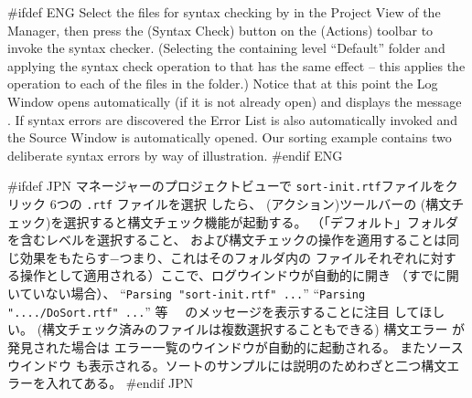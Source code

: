\documentclass[\pformat,12pt]{article}
\newcommand{\guicmd}[1]{{\sf #1}}
\newcommand{\guicmd}[1]{{\gt #1}}
\begin{document}
#ifdef ENG
Select the files for syntax checking by
 in the \guicmd{Project View}
of the \guicmd{Manager}, then press the 
(\guicmd{Syntax Check}) button on the (\guicmd{Actions})
toolbar to invoke the syntax checker. (Selecting the containing level
 ``Default'' folder and applying the syntax check operation to that
 has the same effect -- this applies the operation to each of the
 files in the folder.) Notice that at this point the
\guicmd{Log Window} opens automatically (if it is not already open)
and displays the message 
.
 If syntax
  errors are discovered the \guicmd{Error List} is
also au\-to\-matically invoked and the \guicmd{Source Window} is
automatically opened. Our sorting example contains two
deliberate syntax errors by way of illustration.
#endif ENG

#ifdef JPN
\guicmd{マネージャー}の\guicmd{プロジェクトビュー}で
{
{\tt sort-init.rtf}ファイルをクリック
}
{
6つの {\tt .rtf} ファイルを選択
}
したら、 
(\guicmd{アクション})ツールバーの  
(\guicmd{構文チェック})を選択すると構文チェック機能が起動する。
（「デフォルト」フォルダを含むレベルを選択すること、
および構文チェックの操作を適用することは同じ効果をもたらす−つまり、これはそのフォルダ内の
ファイルそれぞれに対する操作として適用される）ここで、\guicmd{ログウインドウ}が自動的に開き
（すでに開いていない場合）、
{
``{\tt Parsing "sort-init.rtf"
    ...}''
}
{
``{\tt Parsing "..../DoSort.rtf" ...}'' 等
}　のメッセージを表示することに注目
してほしい。
{
(構文チェック済みのファイルは複数選択することもできる)
}
{
} 
構文エラー が発見された場合は
\guicmd{エラー一覧}のウインドウが自動的に起動される。
また\guicmd{ソースウインドウ} も表示される。ソートのサンプルには説明のためわざと二つ構文エラーを入れてある。
#endif JPN
\end{document}
